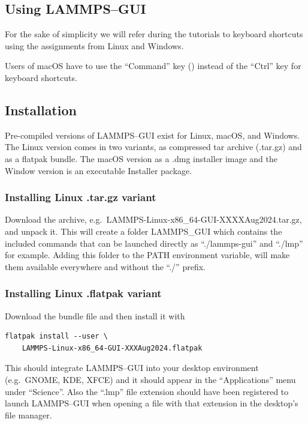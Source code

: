 \documentclass[9pt,tutorial]{livecoms}
\begin{document}
\begin{appendices}
\section{Using LAMMPS--GUI}
\label{using-lammps-gui-label}

\begin{note}
  For the sake of simplicity we will refer during the tutorials to
  keyboard shortcuts using the assignments from Linux and Windows.

  Users of macOS have to use the ``Command'' key (\cmd) instead of the
  ``Ctrl'' key for keyboard shortcuts.
\end{note}

\subsection{Installation}

Pre-compiled versions of LAMMPS--GUI exist for Linux, {macOS}, and
Windows.  The Linux version comes in two variants, as compressed tar
archive (.tar.gz) and as a flatpak \cite{flatpak_home} bundle. The macOS
version as a .dmg installer image and the Window version is an
executable Installer package.

\subsubsection{Installing Linux .tar.gz variant}

Download the archive, e.g.~LAMMPS-Linux-x86\_64-GUI-XXXXAug2024.tar.gz,
and unpack it.  This will create a folder LAMMPS\_GUI which contains the
included commands that can be launched directly as ``./lammps-gui'' and
``./lmp'' for example.  Adding this folder to the PATH environment
variable, will make them available everywhere and without the ``./''
prefix.

\subsubsection{Installing Linux .flatpak variant}

Download the bundle file and then install it with
{
\normalsize
\begin{verbatim}
flatpak install --user \
    LAMMPS-Linux-x86_64-GUI-XXXAug2024.flatpak
\end{verbatim}
}
This should integrate LAMMPS--GUI into your desktop environment
(e.g.~GNOME, KDE, XFCE) and it should appear in the ``Applications''
menu under ``Science''.  Also the ``.lmp'' file extension should have
been registered to launch LAMMPS--GUI when opening a file with that
extension in the desktop's file manager.


\end{appendices}
\end{document}

